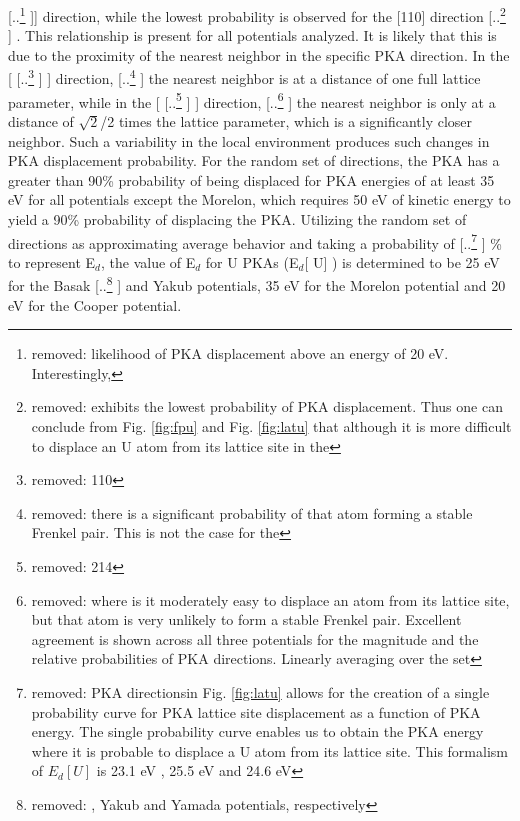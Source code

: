 \documentclass[review]{elsarticle} %
\providecommand{\DIFaddtex}[1]{{\protect\color{blue} \sf #1}} %
\providecommand{\DIFdeltex}[1]{{\protect\color{red} [..\footnote{removed: #1} ]}} %
\providecommand{\DIFaddbegin}{} %
\providecommand{\DIFaddend}{} %
\providecommand{\DIFdelbegin}{} %
\providecommand{\DIFdelend}{} %
\providecommand{\DIFadd}[1]{\texorpdfstring{\DIFaddtex{#1}}{#1}} %
\providecommand{\DIFdel}[1]{\texorpdfstring{\DIFdeltex{#1}}{}} %
\newcommand{\DIFscaledelfig}{0.5}
\newlength{\DIFdelgraphicswidth} %
\newlength{\DIFdelgraphicsheight} %
\newcommand{\DIFaddincludegraphics}[2][]{{\color{blue}\fbox{\DIFOincludegraphics[#1]{#2}}}} %
\newcommand{\DIFdelincludegraphics}[2][]{%
\sbox{\DIFdelgraphicsbox}{\DIFOincludegraphics[#1]{#2}}%
\settoboxwidth{\DIFdelgraphicswidth}{\DIFdelgraphicsbox} %
\settoboxtotalheight{\DIFdelgraphicsheight}{\DIFdelgraphicsbox} %
\scalebox{\DIFscaledelfig}{%
\parbox[b]{\DIFdelgraphicswidth}{\usebox{\DIFdelgraphicsbox}\\[-\baselineskip] \rule{\DIFdelgraphicswidth}{0em}}\llap{\resizebox{\DIFdelgraphicswidth}{\DIFdelgraphicsheight}{%
\setlength{\unitlength}{\DIFdelgraphicswidth}%
\begin{picture}(1,1)%
\thicklines\linethickness{2pt} %
{\color[rgb]{1,0,0}\put(0,0){\framebox(1,1){}}}%
{\color[rgb]{1,0,0}\put(0,0){\line( 1,1){1}}}%
{\color[rgb]{1,0,0}\put(0,1){\line(1,-1){1}}}%
\end{picture}%
}\hspace*{3pt}}} %
} %
\DeclareRobustCommand{\DIFaddbegin}{\DIFOaddbegin \let\includegraphics\DIFaddincludegraphics} %
\DeclareRobustCommand{\DIFaddend}{\DIFOaddend \let\includegraphics\DIFOincludegraphics} %
\DeclareRobustCommand{\DIFdelbegin}{\DIFOdelbegin \let\includegraphics\DIFdelincludegraphics} %
\DeclareRobustCommand{\DIFdelend}{\DIFOaddend \let\includegraphics\DIFOincludegraphics} %
\begin{document}
\DIFdel{likelihood of PKA displacement above an energy of 20 eV. Interestingly, }\DIFdelend \DIFaddbegin ] \DIFadd{direction, while the lowest probability is observed for }\DIFaddend the [110] direction\DIFdelbegin \DIFdel{exhibits the lowest probability of PKA displacement. Thus one can conclude from Fig. \ref{fig:fpu} and Fig. \ref{fig:latu} that although it is more difficult to displace an U atom from its lattice site in the }\DIFdelend \DIFaddbegin \DIFadd{. This relationship is present for all potentials analyzed. It is likely that this is due to the proximity of the nearest neighbor in the specific PKA direction. In the }\DIFaddend [\DIFdelbegin \DIFdel{110}\DIFdelend \DIFaddbegin \DIFadd{100}\DIFaddend ] direction, \DIFdelbegin \DIFdel{there is a significant probability of that atom forming a stable Frenkel pair. This is not the case for the }\DIFdelend \DIFaddbegin \DIFadd{the nearest neighbor is at a distance of one full lattice parameter, while in the }\DIFaddend [\DIFdelbegin \DIFdel{214}\DIFdelend \DIFaddbegin \DIFadd{110}\DIFaddend ] direction, \DIFdelbegin \DIFdel{where is it moderately easy to displace an atom from its lattice site, but that atom is very unlikely to form a stable Frenkel pair. Excellent agreement is shown across all three potentials for the magnitude and the relative probabilities of PKA directions. Linearly averaging over the set }\DIFdelend \DIFaddbegin \DIFadd{the nearest neighbor is only at a distance of $\sqrt{2}$/2 times the lattice parameter, which is a significantly closer neighbor. Such a variability in the local environment produces such changes in PKA displacement probability. For the random set of directions, the PKA has a greater than 90\% probability of being displaced for PKA energies of at least 35 eV for all potentials except the Morelon, which requires 50 eV of kinetic energy to yield a 90\% probability of displacing the PKA. Utilizing the random set of directions as approximating average behavior and taking a probability }\DIFaddend of \DIFdelbegin \DIFdel{PKA directionsin Fig. \ref{fig:latu} allows for the creation of a single probability curve for PKA lattice site displacement as a function of PKA energy. The single probability curve enables us to obtain the PKA energy where it is probable to displace a U atom from its lattice site. This formalism of $E_d [U]$ is 23.1 eV , 25.5 eV and 24.6 eV }\DIFdelend \DIFaddbegin \DIFadd{50\% to represent E$_d$, the value of E$_d$ for U PKAs (E$_d$}[\DIFadd{U}]\DIFadd{) is determined to be 25 eV }\DIFaddend for the Basak \DIFdelbegin \DIFdel{, Yakub and Yamada potentials, respectively}\DIFdelend \DIFaddbegin \DIFadd{and Yakub potentials, 35 eV for the Morelon potential and 20 eV for the Cooper potential}\DIFaddend .
\end{document}

